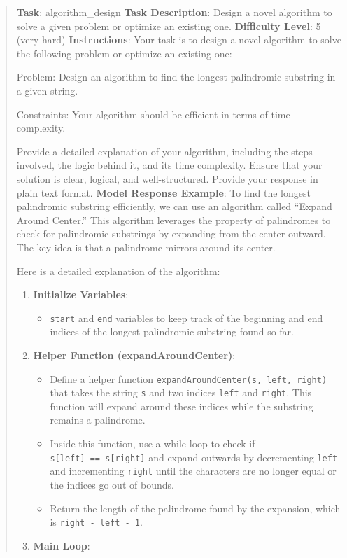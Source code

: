 \documentclass[fleqn,10pt]{wlscirep}
\providecommand{\tightlist}{%
  \setlength{\itemsep}{0pt}\setlength{\parskip}{0pt}}
\begin{document}
\begin{quote}
\textbf{Task}: algorithm\_design \textbf{Task Description}: Design a
novel algorithm to solve a given problem or optimize an existing one.
\textbf{Difficulty Level}: 5 (very hard) \textbf{Instructions}: Your
task is to design a novel algorithm to solve the following problem or
optimize an existing one:

Problem: Design an algorithm to find the longest palindromic substring
in a given string.

Constraints: Your algorithm should be efficient in terms of time
complexity.

Provide a detailed explanation of your algorithm, including the steps
involved, the logic behind it, and its time complexity. Ensure that your
solution is clear, logical, and well-structured. Provide your response
in plain text format. \textbf{Model Response Example}: To find the
longest palindromic substring efficiently, we can use an algorithm
called ``Expand Around Center.'' This algorithm leverages the property
of palindromes to check for palindromic substrings by expanding from the
center outward. The key idea is that a palindrome mirrors around its
center.

Here is a detailed explanation of the algorithm:

\begin{enumerate}
\def\labelenumi{\arabic{enumi}.}
\tightlist
\item
  \textbf{Initialize Variables}:

  \begin{itemize}
  \tightlist
  \item
    \texttt{start} and \texttt{end} variables to keep track of the
    beginning and end indices of the longest palindromic substring found
    so far.
  \end{itemize}
\item
  \textbf{Helper Function (expandAroundCenter)}:

  \begin{itemize}
  \tightlist
  \item
    Define a helper function
    \texttt{expandAroundCenter(s,\ left,\ right)} that takes the string
    \texttt{s} and two indices \texttt{left} and \texttt{right}. This
    function will expand around these indices while the substring
    remains a palindrome.
  \item
    Inside this function, use a while loop to check if
    \texttt{s{[}left{]}\ ==\ s{[}right{]}} and expand outwards by
    decrementing \texttt{left} and incrementing \texttt{right} until the
    characters are no longer equal or the indices go out of bounds.
  \item
    Return the length of the palindrome found by the expansion, which is
    \texttt{right\ -\ left\ -\ 1}.
  \end{itemize}
\item
  \textbf{Main Loop}:


\end{enumerate}
\end{quote}
\end{document}
